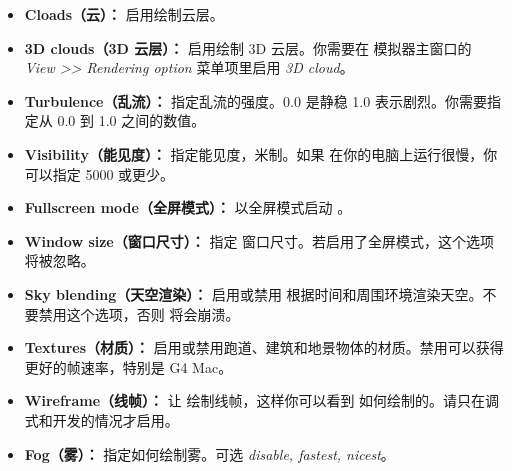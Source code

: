 \begin{itemize}
\item \textbf{Cloads（云）：} 启用绘制云层。
\item \textbf{3D clouds（3D 云层）：} 启用绘制 3D 云层。你需要在 \FlightGear{} 模拟器主窗口的 \textit{View >> Rendering option} 菜单项里启用 \textit{3D cloud}。
\item \textbf{Turbulence（乱流）：} 指定乱流的强度。0.0 是静稳 1.0 表示剧烈。你需要指定从 0.0 到 1.0 之间的数值。
\item \textbf{Visibility（能见度）：} 指定能见度，米制。如果 \FlightGear{} 在你的电脑上运行很慢，你可以指定 5000 或更少。
\item \textbf{Fullscreen mode（全屏模式）：} 以全屏模式启动 \FlightGear{}。
\item \textbf{Window size（窗口尺寸）：} 指定 \FlightGear{} 窗口尺寸。若启用了全屏模式，这个选项将被忽略。
\item \textbf{Sky blending（天空渲染）：} 启用或禁用 \FlightGear{} 根据时间和周围环境渲染天空。不要禁用这个选项，否则 \FlightGear{} 将会崩溃。
\item \textbf{Textures（材质）：} 启用或禁用跑道、建筑和地景物体的材质。禁用可以获得更好的帧速率，特别是 G4 Mac。
\item \textbf{Wireframe（线帧）：} 让 \FlightGear{} 绘制线帧，这样你可以看到 \FlightGear{} 如何绘制的。请只在调式和开发的情况才启用。
\item \textbf{Fog（雾）：} 指定如何绘制雾。可选 \textit{disable, fastest, nicest}。
\end{itemize}
\fi
